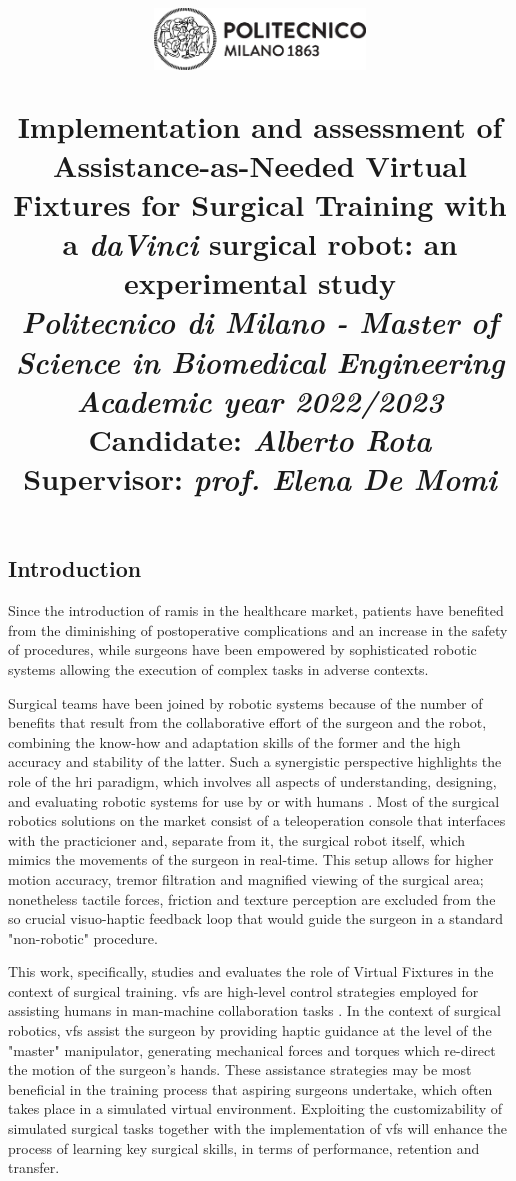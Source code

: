 \documentclass{article}
\title{
\begin{figure}[h!]
\centering
\includegraphics[width=0.5\textwidth]{images/logo_polimi_scritta2.eps}
\end{figure}
\textbf{Implementation and assessment of Assistance-as-Needed Virtual Fixtures for Surgical Training with a \textit{daVinci} surgical robot: an experimental study}
\\
\vspace{0.5cm}\large{\textit{Politecnico di Milano - Master of Science in Biomedical Engineering}}
\\
\vspace{0.5cm}\textit{\small{Academic year 2022/2023}}\vspace{0.5cm}\\
{\large \textbf{Candidate: \textit{Alberto Rota}}\\
\textbf{Supervisor: \textit{prof. Elena De Momi}}}}
\author{}
\date{}
\begin{document}
\maketitle

\begin{multicols}{2}

\section{Introduction}
Since the introduction of \ac{ramis} in the healthcare market, patients have benefited from the diminishing of postoperative complications and an increase in the safety of procedures, while surgeons have been empowered by sophisticated robotic systems allowing the execution of complex tasks in adverse contexts. 

Surgical teams have been joined by robotic systems because of the number of benefits that result from the collaborative effort of the surgeon and the robot, combining the know-how and adaptation skills of the former and the high accuracy and stability of the latter. Such a synergistic perspective highlights the role of the \ac{hri} paradigm, which involves all aspects of understanding, designing, and evaluating robotic systems for use by or with humans \cite{Goodrich2007}. Most of the surgical robotics solutions on the market consist of a teleoperation console that interfaces with the practicioner and, separate from it, the surgical robot itself, which mimics the movements of the surgeon in real-time. This setup allows for higher motion accuracy, tremor filtration and magnified viewing of the surgical area; nonetheless tactile forces, friction and texture perception are excluded from the so crucial visuo-haptic feedback loop that would guide the surgeon in a standard "non-robotic" procedure.

This work, specifically, studies and evaluates the role of Virtual Fixtures in the context of surgical training. \acp{vf} are high-level control strategies employed for assisting humans in man-machine collaboration tasks \cite{Bowyer2014}. In the context of surgical robotics, \acp{vf} assist the surgeon by providing haptic guidance at the level of the "master" manipulator, generating mechanical forces and torques which re-direct the motion of the surgeon's hands. These assistance strategies may be most beneficial in the training process that aspiring surgeons undertake, which often takes place in a simulated virtual environment. Exploiting the customizability of simulated surgical tasks together with the implementation of \acp{vf} will enhance the process of learning key surgical skills, in terms of performance, retention and transfer.

\end{multicols}
\end{document}
